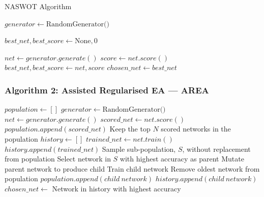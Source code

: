 \documentclass{beamer}
\begin{document}
\begin{frame}{NASWOT Algorithm}
    \begin{algorithm}[H]
        \caption{NASWOT}
        \begin{algorithmic}
            \State $generator \gets \text{RandomGenerator()}$ 
            
            \State $best\_net, best\_score \gets \text{None}, 0$ 
            
                \State $net \gets generator.generate()$
                \State $score \gets net.score()$
                    \State $best\_net, best\_score \gets net, score$
                \EndIf
            \EndFor
            \State $chosen\_net \gets best\_net$
        \end{algorithmic}
    \end{algorithm}
\end{frame}


\begin{frame}[shrink]
\frametitle{Algorithm 2: Assisted Regularised EA — AREA}
    \begin{algorithm}[H]
        \caption{Assisted Regularised EA — AREA}
        \begin{algorithmic}[1] %
            \State $population \gets []$
            \State $generator \gets \text{RandomGenerator()}$
                \State $net \gets generator.generate()$
                \State $scored\_net \gets net.score()$
                \State $population.append(scored\_net)$
            \EndFor
            \State Keep the top $N$ scored networks in the population
            \State $history \gets []$
                \State $trained\_net \gets net.train()$
                \State $history.append(trained\_net)$
            \EndFor
                \State Sample sub-population, $S$, without replacement from population
                \State Select network in $S$ with highest accuracy as parent
                \State Mutate parent network to produce child
                \State Train child network
                \State Remove oldest network from population
                \State $population.append(child\ network)$
                \State $history.append(child\ network)$
            \EndWhile
            \State $chosen\_net \gets$ Network in history with highest accuracy
        \end{algorithmic}
    \end{algorithm}
\end{frame}
\end{document}
